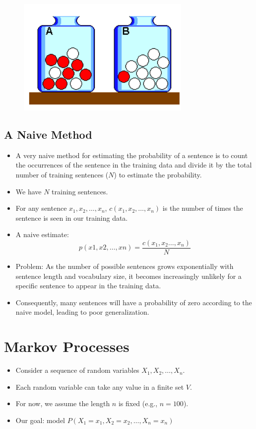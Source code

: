 \documentclass{book}
\begin{document}
\begin{figure}[h]
\includegraphics[scale = 0.6]{pics/lmsampling.png}
\end{figure}

 
\subsection{A Naive Method}
\begin{itemize}
\item A very naive method for estimating the probability of a sentence is to count the occurrences of the sentence in the training data and divide it by the total number of training sentences ($N$) to estimate the probability.
\item We have $N$ training sentences.
\item For any sentence $x_1, x_2, \ldots, x_n$, $c(x_1, x_2, \ldots, x_n)$ is the number of times the sentence is seen in our training data.
\item A naive estimate: \begin{displaymath}
                        p(x1,x2,…,xn)=\frac{c(x_1,x_2 \dots,x_n)}{N}
                        \end{displaymath}

                        
\item Problem: As the number of possible sentences grows exponentially with sentence length and vocabulary size, it becomes increasingly unlikely for a specific sentence to appear in the training data. 

\item Consequently, many sentences will have a probability of zero according to the naive model, leading to poor generalization.                      
\end{itemize}


\section{Markov Processes}
    \begin{itemize}
        \item Consider a sequence of random variables $X_1, X_2, \ldots, X_n$.
        \item Each random variable can take any value in a finite set $V$.
        \item For now, we assume the length $n$ is fixed (e.g., $n = 100$).
        \item Our goal: model $P(X_1 = x_1, X_2 = x_2, \ldots, X_n = x_n)$
    \end{itemize}
\end{document}
